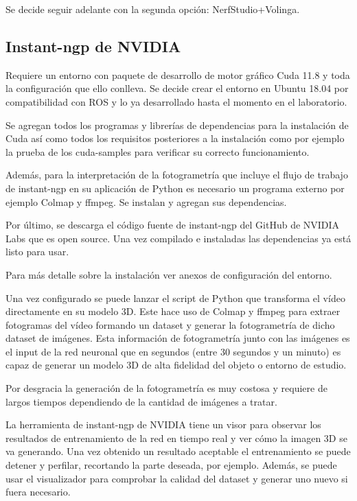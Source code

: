 \documentclass[a4paper, 12pt, spanish, twoside]{article}
\begin{document}
Se decide seguir adelante con la segunda opción: NerfStudio+Volinga.

\subsection{Instant-ngp de NVIDIA}

Requiere un entorno con paquete de desarrollo de motor gráfico Cuda 11.8 y toda la configuración que ello conlleva. Se decide crear el entorno en Ubuntu 18.04 por compatibilidad con ROS y lo ya desarrollado hasta el momento en el laboratorio.

Se agregan todos los programas y librerías de dependencias para la instalación de Cuda así como todos los requisitos posteriores a la instalación como por ejemplo la prueba de los cuda-samples para verificar su correcto funcionamiento.

Además, para la interpretación de la fotogrametría que incluye el flujo de trabajo de instant-ngp en su aplicación de Python es necesario un programa externo por ejemplo Colmap y ffmpeg. Se instalan y agregan sus dependencias.

Por último, se descarga el código fuente de instant-ngp del GitHub de NVIDIA Labs que es open source. Una vez compilado e instaladas las dependencias ya está listo para usar.

Para más detalle sobre la instalación ver anexos de configuración del entorno.

Una vez configurado se puede lanzar el script de Python que transforma el vídeo directamente en su modelo 3D. Este hace uso de Colmap y ffmpeg para extraer fotogramas del vídeo formando un dataset y generar la fotogrametría de dicho dataset de imágenes. Esta información de fotogrametría junto con las imágenes es el input de la red neuronal que en segundos (entre 30 segundos y un minuto) es capaz de generar un modelo 3D de alta fidelidad del objeto o entorno de estudio.

Por desgracia la generación de la fotogrametría es muy costosa y requiere de largos tiempos dependiendo de la cantidad de imágenes a tratar.

La herramienta de instant-ngp de NVIDIA tiene un visor para observar los resultados de entrenamiento de la red en tiempo real y ver cómo la imagen 3D se va generando. Una vez obtenido un resultado aceptable el entrenamiento se puede detener y perfilar, recortando la parte deseada, por ejemplo. Además, se puede usar el visualizador para comprobar la calidad del dataset y generar uno nuevo si fuera necesario.
\end{document}
